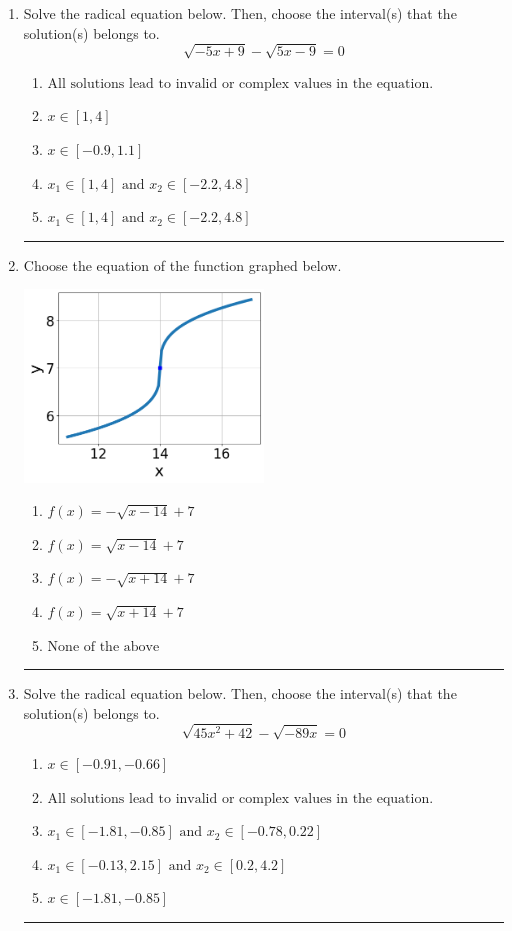 \documentclass[14pt]{extbook}
\newcommand{\litem}[1]{\item#1\hspace*{-1cm}\rule{\textwidth}{0.4pt}}
\begin{document}
\begin{enumerate}
{\begin{enumerate}[label=\Alph*.]
\end{enumerate} }
\litem{
Solve the radical equation below. Then, choose the interval(s) that the solution(s) belongs to.\[ \sqrt{-5 x + 9} - \sqrt{5 x - 9} = 0 \]\begin{enumerate}[label=\Alph*.]
\item \( \text{All solutions lead to invalid or complex values in the equation.} \)
\item \( x \in [1,4] \)
\item \( x \in [-0.9,1.1] \)
\item \( x_1 \in [1, 4] \text{ and } x_2 \in [-2.2,4.8] \)
\item \( x_1 \in [1, 4] \text{ and } x_2 \in [-2.2,4.8] \)

\end{enumerate} }
\litem{
Choose the equation of the function graphed below.
\begin{center}
    \includegraphics[width=0.5\textwidth]{../Figures/radicalGraphToEquationCopyB.png}
\end{center}
\begin{enumerate}[label=\Alph*.]
\item \( f(x) = - \sqrt{x - 14} + 7 \)
\item \( f(x) = \sqrt{x - 14} + 7 \)
\item \( f(x) = - \sqrt{x + 14} + 7 \)
\item \( f(x) = \sqrt{x + 14} + 7 \)
\item \( \text{None of the above} \)

\end{enumerate} }
\litem{
Solve the radical equation below. Then, choose the interval(s) that the solution(s) belongs to.\[ \sqrt{45 x^2 + 42} - \sqrt{-89 x} = 0 \]\begin{enumerate}[label=\Alph*.]
\item \( x \in [-0.91,-0.66] \)
\item \( \text{All solutions lead to invalid or complex values in the equation.} \)
\item \( x_1 \in [-1.81, -0.85] \text{ and } x_2 \in [-0.78,0.22] \)
\item \( x_1 \in [-0.13, 2.15] \text{ and } x_2 \in [0.2,4.2] \)
\item \( x \in [-1.81,-0.85] \)


\end{enumerate}}
\end{enumerate}
\end{document}

